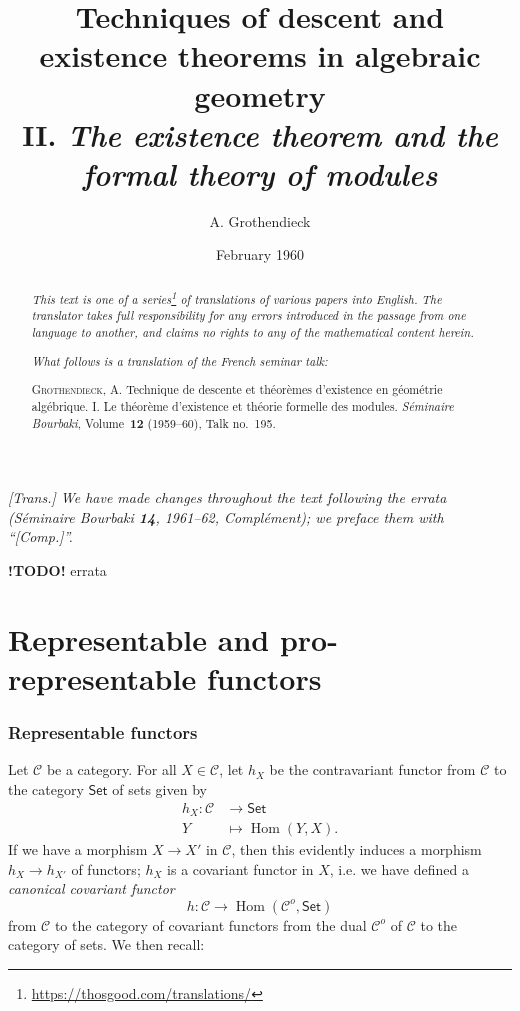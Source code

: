 \documentclass{article}
\title{Techniques of descent and existence theorems in algebraic geometry\\II. \emph{The existence theorem and the formal theory of modules}}
\author{A. Grothendieck}
\date{February 1960}
\theoremstyle{plain}
\theoremstyle{definition}
\newcommand{\cat}[1]{{\mathcal{#1}}}
\newcommand{\Set}{\mathsf{Set}}
\DeclareMathOperator{\Hom}{Hom}
\newcommand{\todo}{\textbf{ !TODO! }}
\newcommand{\oldpage}[1]{\marginpar{\footnotesize$\Big\vert$ \textit{p.~#1}}}
\begin{document}
\maketitle
\thispagestyle{fancy}

\renewcommand{\abstractname}{Translator's note.}

\begin{abstract}
  \renewcommand*{\thefootnote}{\fnsymbol{footnote}}
  \emph{This text is one of a series\footnote{\url{https://thosgood.com/translations/}} of translations of various papers into English.}
  \emph{The translator takes full responsibility for any errors introduced in the passage from one language to another, and claims no rights to any of the mathematical content herein.}

  \medskip
  
  \emph{What follows is a translation of the French seminar talk:}

  \medskip\noindent
  \textsc{Grothendieck, A.}
  Technique de descente et th\'{e}or\`{e}mes d'existence en g\'{e}om\'{e}trie alg\'{e}brique. I. Le th\'{e}or\`{e}me d'existence et th\'{e}orie formelle des modules.
  \emph{S\'{e}minaire Bourbaki}, Volume~\textbf{12} (1959--60), Talk no.~195.
\end{abstract}

\setcounter{footnote}{0}

\setcounter{tocdepth}{1}
\tableofcontents



\subsubsection*{}

\emph{[Trans.] We have made changes throughout the text following the errata (\emph{S\'{e}minaire Bourbaki} \textbf{14}, 1961--62, Compl\'{e}ment); we preface them with ``[Comp.]''.}
\medskip

\todo{errata}

\oldpage{195-01}
\part{Representable and pro-representable functors}
\label{A}

\section{Representable functors}
\label{A.1}

Let $\cat{C}$ be a category.
For all $X\in\cat{C}$, let $h_X$ be the contravariant functor from $\cat{C}$ to the category $\Set$ of sets given by
\[
  \begin{aligned}
    h_X\colon \cat{C} &\to \Set
  \\Y&\mapsto \Hom(Y,X).
  \end{aligned}
\]
If we have a morphism $X\to X'$ in $\cat{C}$, then this evidently induces a morphism $h_X\to h_{X'}$ of functors;
$h_X$ is a covariant functor in $X$, i.e. we have defined a \emph{canonical covariant functor}
\[
  h\colon \cat{C} \to \Hom(\cat{C}^o,\Set)
\]
from $\cat{C}$ to the category of covariant functors from the dual $\cat{C}^o$ of $\cat{C}$ to the category of sets.
We then recall:
\end{document}
